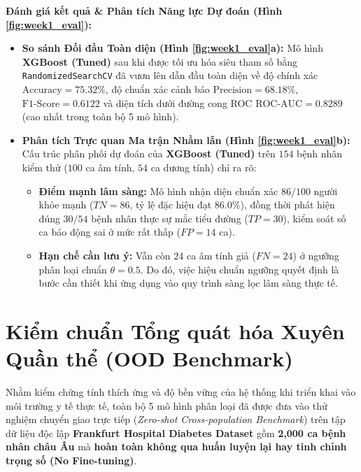 \documentclass[12pt,a4paper]{report}
\begin{document}
\textbf{Đánh giá kết quả \& Phân tích Năng lực Dự đoán (Hình \ref{fig:week1_eval}):}
\begin{itemize}[leftmargin=1.5em]
    \item \textbf{So sánh Đối đầu Toàn diện (Hình \ref{fig:week1_eval}a):} Mô hình \textbf{XGBoost (Tuned)} sau khi được tối ưu hóa siêu tham số bằng \texttt{RandomizedSearchCV} đã vươn lên dẫn đầu toàn diện về độ chính xác $\text{Accuracy} = \mathbf{75.32\%}$, độ chuẩn xác cảnh báo $\text{Precision} = \mathbf{68.18\%}$, $\text{F1-Score} = \mathbf{0.6122}$ và diện tích dưới đường cong ROC $\text{ROC-AUC} = \mathbf{0.8289}$ (cao nhất trong toàn bộ 5 mô hình).
    
    \item \textbf{Phân tích Trực quan Ma trận Nhầm lẫn (Hình \ref{fig:week1_eval}b):}
    Cấu trúc phân phối dự đoán của \textbf{XGBoost (Tuned)} trên $154$ bệnh nhân kiểm thử ($100$ ca âm tính, $54$ ca dương tính) chỉ ra rõ:
    \begin{itemize}[leftmargin=1.2em]
        \item \textbf{Điểm mạnh lâm sàng:} Mô hình nhận diện chuẩn xác $86/100$ người khỏe mạnh ($TN = 86$, tỷ lệ đặc hiệu đạt $86.0\%$), đồng thời phát hiện đúng $30/54$ bệnh nhân thực sự mắc tiểu đường ($TP = 30$), kiểm soát số ca báo động sai ở mức rất thấp ($FP = 14$ ca).
        \item \textbf{Hạn chế cần lưu ý:} Vẫn còn $24$ ca âm tính giả ($FN = 24$) ở ngưỡng phân loại chuẩn $\theta = 0.5$. Do đó, việc hiệu chuẩn ngưỡng quyết định là bước cần thiết khi ứng dụng vào quy trình sàng lọc lâm sàng thực tế.
    \end{itemize}
\end{itemize}

\section{Kiểm chuẩn Tổng quát hóa Xuyên Quần thể (OOD Benchmark)}

Nhằm kiểm chứng tính thích ứng và độ bền vững của hệ thống khi triển khai vào môi trường y tế thực tế, toàn bộ 5 mô hình phân loại đã được đưa vào thử nghiệm chuyển giao trực tiếp (\textit{Zero-shot Cross-population Benchmark}) trên tập dữ liệu độc lập \textbf{Frankfurt Hospital Diabetes Dataset} gồm \textbf{2,000 ca bệnh nhân châu Âu} mà \textbf{hoàn toàn không qua huấn luyện lại hay tinh chỉnh trọng số (No Fine-tuning)}.
\end{document}
